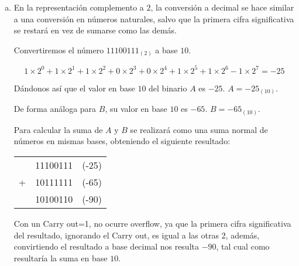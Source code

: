 \begin{frame}
	\begin{solution}
		\begin{enumerate}[b)]
			\item
			      En la representación complemento a $2$, la conversión a
			      decimal se hace similar a una conversión en números
			      naturales, salvo que la primera cifra significativa se
			      restará en vez de sumarse como las demás.

			      Convertiremos el número $11100111_{\left(2\right)}$ a base $10$.

			      \begin{equation*}
				      1\times 2^{0}+
				      1\times2^{1}+
				      1\times2^{2}+
				      0\times2^{3}+
				      0\times2^{4}+
				      1\times2^{5}+
				      1\times2^{6}-
				      1\times2^{7}=
				      -25
			      \end{equation*}

			      Dándonos así que el valor en base $10$ del binario $A$ es
			      $-25$.
			      $A=-{25}_{\left(10\right)}$.

			      De forma análoga para $B$, su valor en base $10$ es $-65$.
			      $B=-{65}_{\left(10\right)}$.

			      Para calcular la suma de $A$ y $B$ se realizará como una
			      suma normal de números en mismas bases, obteniendo el
			      siguiente resultado:

			      \begin{table}[ht!]
				      \begin{tabular}{c c c}
					        & 11100111 & (-25) \\
					      + & 10111111 & (-65) \\
					      \hline
					        & 10100110 & (-90)
				      \end{tabular}
			      \end{table}
			      Con un Carry out=1, no ocurre overflow, ya que la primera
			      cifra significativa del resultado, ignorando el Carry
			      out, es igual a las otras $2$, además, convirtiendo el
			      resultado a base decimal nos resulta $-90$, tal cual como
			      resultaría la suma en base $10$.
		\end{enumerate}
	\end{solution}
\end{frame}


